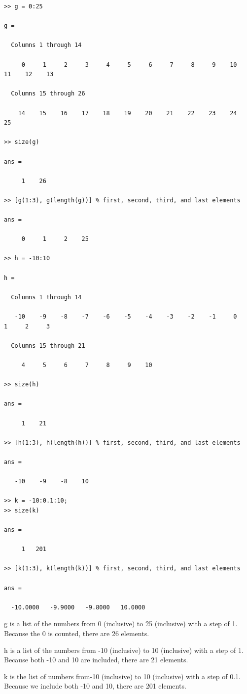 \documentclass[11pt]{article}
\begin{document}
\begin{lstlisting}
>> g = 0:25

g =

  Columns 1 through 14

     0     1     2     3     4     5     6     7     8     9    10    11    12    13

  Columns 15 through 26

    14    15    16    17    18    19    20    21    22    23    24    25

>> size(g)

ans =

     1    26

>> [g(1:3), g(length(g))] % first, second, third, and last elements

ans =

     0     1     2    25

>> h = -10:10

h =

  Columns 1 through 14

   -10    -9    -8    -7    -6    -5    -4    -3    -2    -1     0     1     2     3

  Columns 15 through 21

     4     5     6     7     8     9    10

>> size(h)

ans =

     1    21

>> [h(1:3), h(length(h))] % first, second, third, and last elements

ans =

   -10    -9    -8    10

>> k = -10:0.1:10;
>> size(k)

ans =

     1   201
     
>> [k(1:3), k(length(k))] % first, second, third, and last elements

ans =

  -10.0000   -9.9000   -9.8000   10.0000

\end{lstlisting}

g is a list of the numbers from 0 (inclusive) to 25 (inclusive) with a step of 1. Because the 0 is counted, there are 26 elements.

h is a list of the numbers from -10 (inclusive) to 10 (inclusive) with a step of 1. Because both -10 and 10 are included, there are 21 elements.

k is the list of numbers from-10 (inclusive) to 10 (inclusive) with a step of 0.1. Because we include both -10 and 10, there are 201 elements.
\end{document}
